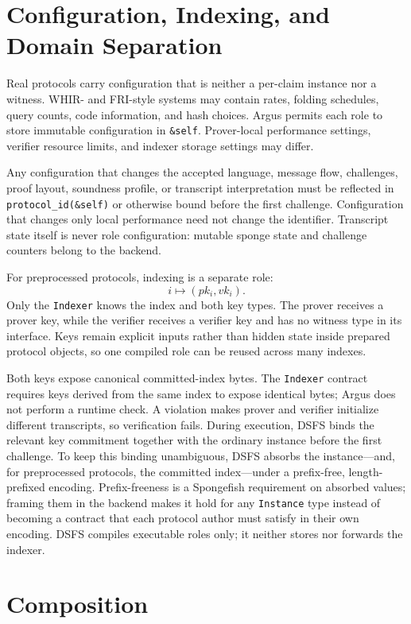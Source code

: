 \documentclass[11pt]{article}
\begin{document}
\section{Configuration, Indexing, and Domain Separation}

Real protocols carry configuration that is neither a per-claim instance nor a
witness. WHIR- and FRI-style systems may contain rates, folding schedules,
query counts, code information, and hash choices. Argus permits each role to
store immutable configuration in \texttt{\&self}. Prover-local performance
settings, verifier resource limits, and indexer storage settings may differ.

Any configuration that changes the accepted language, message flow,
challenges, proof layout, soundness profile, or transcript interpretation must
be reflected in \texttt{protocol\_id(\&self)} or otherwise bound before the
first challenge. Configuration that changes only local performance need not
change the identifier. Transcript state itself is never role configuration:
mutable sponge state and challenge counters belong to the backend.

For preprocessed protocols, indexing is a separate role:
\[
    i \longmapsto (pk_i,vk_i).
\]
Only the \texttt{Indexer} knows the index and both key types. The prover
receives a prover key, while the verifier receives a verifier key and has no
witness type in its interface. Keys remain explicit inputs rather than hidden
state inside prepared protocol objects, so one compiled role can be reused
across many indexes.

Both keys expose canonical committed-index bytes. The \texttt{Indexer} contract
requires keys derived from the same index to expose identical bytes; Argus does
not perform a runtime check. A violation makes prover and verifier initialize
different transcripts, so verification fails. During execution, DSFS binds the
relevant key commitment together with the ordinary instance before the first
challenge. To keep this binding unambiguous, DSFS absorbs the instance---and,
for preprocessed protocols, the committed index---under a prefix-free,
length-prefixed encoding. Prefix-freeness is a Spongefish requirement on
absorbed values; framing them in the backend makes it hold for any
\texttt{Instance} type instead of becoming a contract that each protocol author
must satisfy in their own encoding. DSFS compiles executable roles only; it
neither stores nor forwards the indexer.

\section{Composition}
\end{document}
